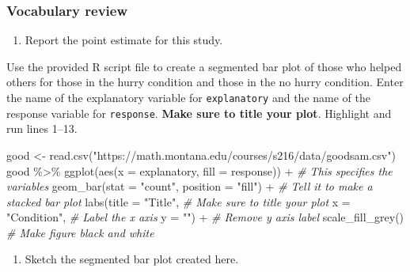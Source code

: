 \documentclass[
]{report}
\newenvironment{Shaded}{\begin{snugshade}}{\end{snugshade}}
\newcommand{\AttributeTok}[1]{\textcolor[rgb]{0.77,0.63,0.00}{#1}}
\newcommand{\CommentTok}[1]{\textcolor[rgb]{0.56,0.35,0.01}{\textit{#1}}}
\newcommand{\FunctionTok}[1]{\textcolor[rgb]{0.00,0.00,0.00}{#1}}
\newcommand{\NormalTok}[1]{#1}
\newcommand{\OtherTok}[1]{\textcolor[rgb]{0.56,0.35,0.01}{#1}}
\newcommand{\SpecialCharTok}[1]{\textcolor[rgb]{0.00,0.00,0.00}{#1}}
\newcommand{\StringTok}[1]{\textcolor[rgb]{0.31,0.60,0.02}{#1}}
\providecommand{\tightlist}{%
  \setlength{\itemsep}{0pt}\setlength{\parskip}{0pt}}
\begin{document}
\hypertarget{vocabulary-review-2}{%
\subsubsection*{Vocabulary review}\label{vocabulary-review-2}}

\begin{enumerate}
\def\labelenumi{\arabic{enumi}.}
\tightlist
\item
  Report the point estimate for this study.
\end{enumerate}

\vspace{0.4in}

Use the provided R script file to create a segmented bar plot of those who helped others for those in the hurry condition and those in the no hurry condition. Enter the name of the explanatory variable for \texttt{explanatory} and the name of the response variable for \texttt{response}. \textbf{Make sure to title your plot}. Highlight and run lines 1--13.

\begin{Shaded}
\begin{Highlighting}[]
\NormalTok{good }\OtherTok{\textless{}{-}} \FunctionTok{read.csv}\NormalTok{(}\StringTok{"https://math.montana.edu/courses/s216/data/goodsam.csv"}\NormalTok{)}
\NormalTok{good }\SpecialCharTok{\%\textgreater{}\%}
  \FunctionTok{ggplot}\NormalTok{(}\FunctionTok{aes}\NormalTok{(}\AttributeTok{x =}\NormalTok{ explanatory, }\AttributeTok{fill =}\NormalTok{ response)) }\SpecialCharTok{+}   \CommentTok{\# This specifies the variables}
  \FunctionTok{geom\_bar}\NormalTok{(}\AttributeTok{stat =} \StringTok{"count"}\NormalTok{, }\AttributeTok{position =} \StringTok{"fill"}\NormalTok{) }\SpecialCharTok{+}  \CommentTok{\# Tell it to make a stacked bar plot}
  \FunctionTok{labs}\NormalTok{(}\AttributeTok{title =} \StringTok{"Title"}\NormalTok{,  }\CommentTok{\# Make sure to title your plot }
       \AttributeTok{x =} \StringTok{"Condition"}\NormalTok{,   }\CommentTok{\# Label the x axis}
       \AttributeTok{y =} \StringTok{""}\NormalTok{) }\SpecialCharTok{+}  \CommentTok{\# Remove y axis label}
  \FunctionTok{scale\_fill\_grey}\NormalTok{()  }\CommentTok{\# Make figure black and white}
\end{Highlighting}
\end{Shaded}

\begin{enumerate}
\def\labelenumi{\arabic{enumi}.}
\setcounter{enumi}{1}
\tightlist
\item
  Sketch the segmented bar plot created here.
\end{enumerate}
\end{document}
